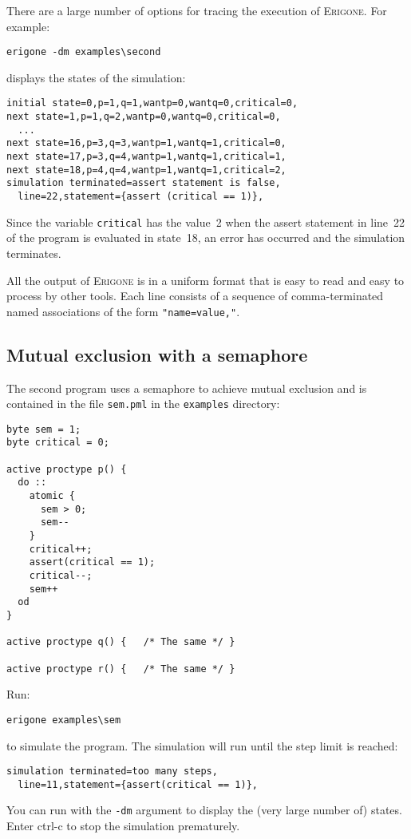 \documentclass[11pt]{article}
\newcommand*{\prg}{\textsc{Erigone}}
\newcommand*{\p}[1]{\texttt{#1}}
\newcommand*{\bu}[1]{\textsf{#1}}
\begin{document}
There are a large number of options for tracing the execution of \prg{}.
For example:
\begin{verbatim}
erigone -dm examples\second
\end{verbatim}
displays the states of the simulation:
\begin{verbatim}
initial state=0,p=1,q=1,wantp=0,wantq=0,critical=0,
next state=1,p=1,q=2,wantp=0,wantq=0,critical=0,
  ...
next state=16,p=3,q=3,wantp=1,wantq=1,critical=0,
next state=17,p=3,q=4,wantp=1,wantq=1,critical=1,
next state=18,p=4,q=4,wantp=1,wantq=1,critical=2,
simulation terminated=assert statement is false,
  line=22,statement={assert (critical == 1)},
\end{verbatim}

Since the variable \p{critical} has the value~2 when the assert
statement in line~22 of the program is evaluated in state~18, an error
has occurred and the simulation terminates.

All the output of \prg{} is in a uniform format that is easy to read and
easy to process by other tools. Each line consists of a sequence of
comma-terminated named associations of the form \p{"name=value,"}.

\subsection*{Mutual exclusion with a semaphore}

The second program uses a semaphore to achieve mutual exclusion
and is contained in the file \p{sem.pml} in the \p{examples} directory:
\begin{verbatim}
byte sem = 1;
byte critical = 0;

active proctype p() {	
  do :: 
    atomic {
      sem > 0;
      sem--
    }
    critical++;
    assert(critical == 1);
    critical--;
    sem++
  od
}

active proctype q() {	/* The same */ }

active proctype r() {	/* The same */ }	
\end{verbatim}

Run:
\begin{verbatim}
erigone examples\sem
\end{verbatim}
to simulate the program. The simulation will run until the step limit is
reached:
\begin{verbatim}
simulation terminated=too many steps,
  line=11,statement={assert(critical == 1)},
\end{verbatim}
You can run with the \p{-dm} argument to display the (very large number
of) states. Enter \bu{ctrl-c} to stop the simulation prematurely.
\end{document}
